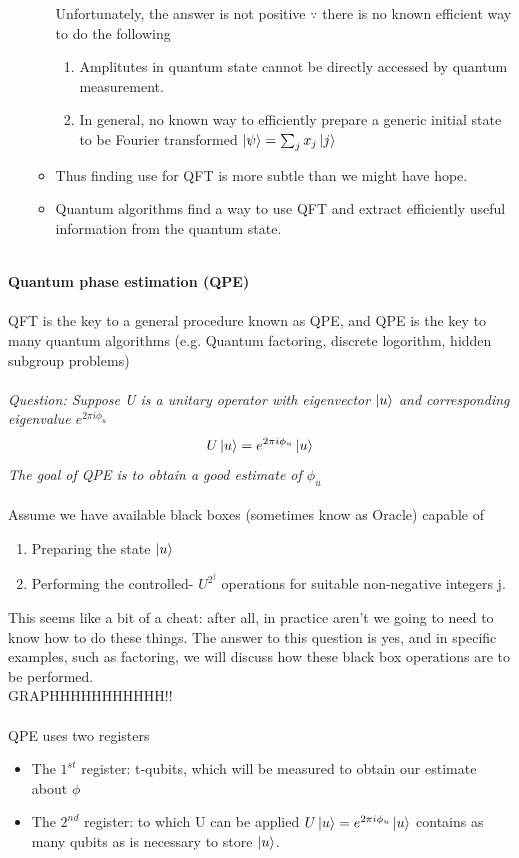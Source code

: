 \documentclass[]{article}
\theoremstyle{nonumberplain}
\begin{document}
\begin{itemize}
\begin{itemize}
		Unfortunately, the answer is not positive $\because$ there is no known efficient way to do the following 
\begin{enumerate}
	\item Amplitutes in quantum state cannot be directly accessed by quantum measurement.
	\item In general, no known way to efficiently prepare a generic initial state to be Fourier transformed $\ket{\psi}= \sum^{}_{j} x_{j}\ket{j}$
\end{enumerate}
	\item Thus finding use for QFT is more subtle than we might have hope.
	\item Quantum algorithms find a way to use QFT and extract efficiently useful information from the quantum state.
\end{itemize}
\end{itemize}
\ \\
\textbf{Quantum phase estimation (QPE)} \\
\\
QFT is the key to a general procedure known as QPE, and QPE is the key to many quantum algorithms (e.g. Quantum factoring, discrete logorithm, hidden subgroup problems) \\
\\
\textit{Question: Suppose U is a unitary operator with eigenvector $\ket{u}$ and corresponding eigenvalue $e^{2\pi i \phi_{u}}$}
\[
U\ket{u}=e^{2\pi i \phi_{u}}\ket{u}
\] 
\textit{The goal of QPE is to obtain a good estimate of $\phi_{u}$}\\
\\
Assume we have available black boxes (sometimes know as Oracle) capable of 
\begin{enumerate}
	\item Preparing the state $\ket{u}$ 
	\item Performing the controlled- $U^{2^{j}}$ operations for suitable non-negative integers j.
\end{enumerate}
This seems like a bit of a cheat: after all, in practice aren't we going to need to know how to do these things. The answer to this question is yes, and in specific examples, such as factoring, we will discuss how these black box operations are to be performed.\\
GRAPHHHHHHHHHHH!! \\
\\
QPE uses two registers
\begin{itemize}
	\item The $1^{st}$ register: t-qubits, which will be measured to obtain our estimate about $\phi$
	\item The $2^{nd}$ register: to which U can be applied $U\ket{u}=e^{2\pi i \phi_{u}}\ket{u}$ contains as many qubits as is necessary to store $\ket{u}$.
\end{itemize}
\end{document}
